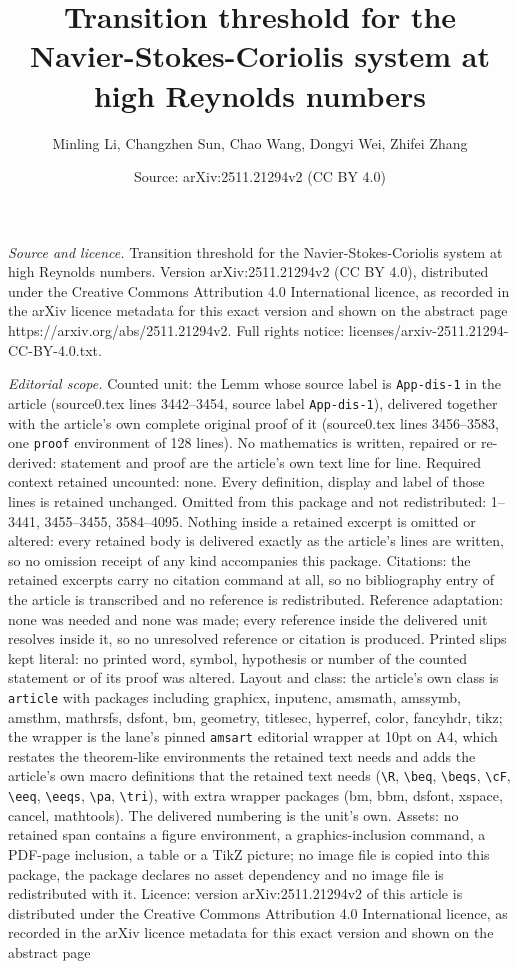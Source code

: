 \documentclass[10pt,a4paper]{amsart}
\title[Transition threshold for the Navier-Stokes-Coriolis system a]{Transition threshold for the Navier-Stokes-Coriolis system at high Reynolds numbers}
\author{Minling Li, Changzhen Sun, Chao Wang, Dongyi Wei, Zhifei Zhang}
\date{Source: arXiv:2511.21294v2 (CC BY 4.0)}
\begin{document}
\maketitle

\noindent\emph{Source and licence.} Transition threshold for the Navier-Stokes-Coriolis system at high Reynolds numbers. Version arXiv:2511.21294v2 (CC BY 4.0), distributed under the Creative Commons Attribution 4.0 International licence, as recorded in the arXiv licence metadata for this exact version and shown on the abstract page https://arxiv.org/abs/2511.21294v2. Full rights notice: licenses/arxiv-2511.21294-CC-BY-4.0.txt.\par\smallskip

\noindent\textit{Editorial scope.} Counted unit: the Lemm whose source label is \texttt{App-dis-1} in the article (source0.tex lines 3442--3454, source label \texttt{App-dis-1}), delivered together with the article's own complete original proof of it (source0.tex lines 3456--3583, one \texttt{proof} environment of 128 lines). No mathematics is written, repaired or re-derived: statement and proof are the article's own text line for line. Required context retained uncounted: none. Every definition, display and label of those lines is retained unchanged. Omitted from this package and not redistributed: 1--3441, 3455--3455, 3584--4095. Nothing inside a retained excerpt is omitted or altered: every retained body is delivered exactly as the article's lines are written, so no omission receipt of any kind accompanies this package. Citations: the retained excerpts carry no citation command at all, so no bibliography entry of the article is transcribed and no reference is redistributed. Reference adaptation: none was needed and none was made; every reference inside the delivered unit resolves inside it, so no unresolved reference or citation is produced. Printed slips kept literal: no printed word, symbol, hypothesis or number of the counted statement or of its proof was altered. Layout and class: the article's own class is \texttt{article} with packages including graphicx, inputenc, amsmath, amssymb, amsthm, mathrsfs, dsfont, bm, geometry, titlesec, hyperref, color, fancyhdr, tikz; the wrapper is the lane's pinned \texttt{amsart} editorial wrapper at 10pt on A4, which restates the theorem-like environments the retained text needs and adds the article's own macro definitions that the retained text needs (\texttt{\textbackslash R}, \texttt{\textbackslash beq}, \texttt{\textbackslash beqs}, \texttt{\textbackslash cF}, \texttt{\textbackslash eeq}, \texttt{\textbackslash eeqs}, \texttt{\textbackslash pa}, \texttt{\textbackslash tri}), with extra wrapper packages (bm, bbm, dsfont, xspace, cancel, mathtools). The delivered numbering is the unit's own. Assets: no retained span contains a figure environment, a graphics-inclusion command, a PDF-page inclusion, a table or a TikZ picture; no image file is copied into this package, the package declares no asset dependency and no image file is redistributed with it. Licence: version arXiv:2511.21294v2 of this article is distributed under the Creative Commons Attribution 4.0 International licence, as recorded in the arXiv licence metadata for this exact version and shown on the abstract page 
\end{document}
